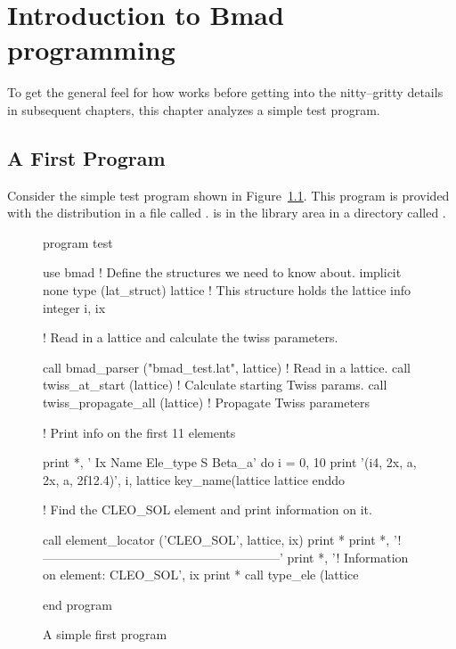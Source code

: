 \chapter{Introduction to Bmad programming}
\label{c:program-info}

To get the general feel for how \bmad works before
getting into the nitty--gritty details in subsequent chapters, this
chapter analyzes a simple test program.

\section{A First Program}

Consider the simple test program shown in Figure~\ref{f:program}.
This program is provided with the \bmad distribution in a file called
.  is in the  library area
in a directory called .

\begin{figure}[ht]
\begin{listing}{1}
program test

  use bmad                 ! Define the structures we need to know about.
  implicit none
  type (lat_struct) lattice  ! This structure holds the lattice info
  integer i, ix

! Read in a lattice and calculate the twiss parameters.

  call bmad_parser ("bmad_test.lat", lattice)    ! Read in a lattice.
  call twiss_at_start (lattice)           ! Calculate starting Twiss params.
  call twiss_propagate_all (lattice)      ! Propagate Twiss parameters

! Print info on the first 11 elements

  print *, ' Ix  Name              Ele_type                   S      Beta_a'
  do i = 0, 10
    print '(i4, 2x, a, 2x, a, 2f12.4)', i, lattice%
                    key_name(lattice%
                    lattice%
  enddo

! Find the CLEO_SOL element and print information on it.

  call element_locator ('CLEO_SOL', lattice, ix)
  print *
  print *, '!---------------------------------------------------------'
  print *, '! Information on element: CLEO_SOL', ix
  print *
  call type_ele (lattice%

end program
\end{listing}
\caption{A simple first program}
\label{f:program}
\end{figure}

